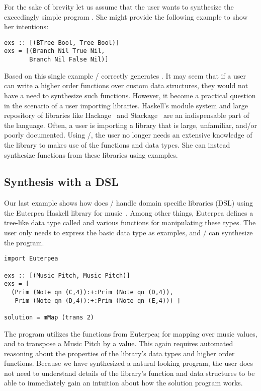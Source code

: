 For the sake of brevity let us assume that the user wants to synthesize
the exceedingly simple program .
She might provide the following example to show her intentions:
\begin{lstlisting}
exs :: [(BTree Bool, Tree Bool)]
exs = [(Branch Nil True Nil,
       Branch Nil False Nil)]
\end{lstlisting}
Based on this single example \ourTool/ correctly generates . It may seem that if a user can write a higher order functions over custom data structures, they would not have a need to synthesize such functions.
However, it become a practical question in the scenario of a user importing libraries.
Haskell's module system and large repository of libraries like Hackage~\cite{hackage} and Stackage~\cite{stackage} are an indispensable part of the language.
Often, a user is importing a library that is large, unfamiliar, and/or poorly documented.
Using \ourTool/, the user no longer needs an extensive knowledge of the library to makes use of the functions and data types. She can instead synthesize functions from these libraries using examples.


\subsection{Synthesis with a DSL}

Our last example shows how does \ourTool/ handle domain specific libraries (DSL) using the Euterpea Haskell library for music~\cite{euterpea}. 
Among other things, Euterpea defines a tree-like data type called  and various functions for manipulating these types.
The user only needs to express the basic data type as examples, and \ourTool/ can synthesize the  program.
\begin{lstlisting}
import Euterpea

exs :: [(Music Pitch, Music Pitch)]
exs = [
  (Prim (Note qn (C,4)):+:Prim (Note qn (D,4)),
   Prim (Note qn (D,4)):+:Prim (Note qn (E,4))) ]
        
solution = mMap (trans 2)
\end{lstlisting}
The  program utilizes the functions from Euterpea;  for mapping over music values, and  to transpose a Music Pitch by a value.
This again requires automated reasoning about the properties of the library's data types and higher order functions.
Because we have synthesized a natural looking program, the user does not need to understand details of the library's function and data structures to be able to immediately gain an intuition about how the solution program works.
